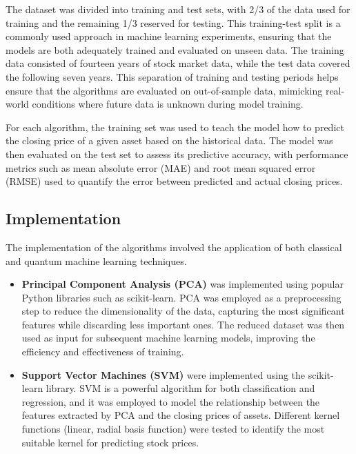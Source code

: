 \documentclass[journal]{IEEEtran}
\begin{document}
The dataset was divided into training and test sets, with 2/3 of the data used for training and the remaining 1/3 reserved for testing. This training-test split is a commonly used approach in machine learning experiments, ensuring that the models are both adequately trained and evaluated on unseen data. The training data consisted of fourteen years of stock market data, while the test data covered the following seven years. This separation of training and testing periods helps ensure that the algorithms are evaluated on out-of-sample data, mimicking real-world conditions where future data is unknown during model training.

For each algorithm, the training set was used to teach the model how to predict the closing price of a given asset based on the historical data. The model was then evaluated on the test set to assess its predictive accuracy, with performance metrics such as mean absolute error (MAE) and root mean squared error (RMSE) used to quantify the error between predicted and actual closing prices.

\subsection{Implementation}

The implementation of the algorithms involved the application of both classical and quantum machine learning techniques.

\begin{itemize}
    \item \textbf{Principal Component Analysis (PCA)} was implemented using popular Python libraries such as scikit-learn. PCA was employed as a preprocessing step to reduce the dimensionality of the data, capturing the most significant features while discarding less important ones. The reduced dataset was then used as input for subsequent machine learning models, improving the efficiency and effectiveness of training.
    \item \textbf{Support Vector Machines (SVM)} were implemented using the scikit-learn library. SVM is a powerful algorithm for both classification and regression, and it was employed to model the relationship between the features extracted by PCA and the closing prices of assets. Different kernel functions (linear, radial basis function) were tested to identify the most suitable kernel for predicting stock prices.
\end{itemize}
\end{document}
